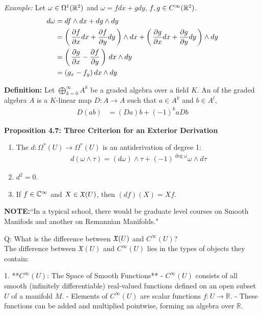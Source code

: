 \documentclass[10pt,a4paper]{report}
\begin{document}
\begin{enumerate}
	\textit{Example: }Let $\omega \in \Omega^1(\mathbb{R}^2)$ and $\omega = fdx+gdy$, $f,g \in C^\infty(\mathbb{R}^2)$.
	\begin{align*}
		d\omega &= df\wedge dx + dg\wedge dy \\
		&= \left (\, \frac{\partial f}{\partial x}dx+\frac{\partial f}{\partial y}dy \,\right )\wedge dx +\left (\, \frac{\partial g}{\partial x}dx+\frac{\partial g}{\partial y}dy \,\right )\wedge dy\\
		&= \left (\, \frac{\partial g}{\partial x}-\frac{\partial f}{\partial y} \,\right )\,dx\wedge dy\\
		&= (g_x-f_y)\,dx\wedge dy
	\end{align*}
	
	\textbf{Definition: } Let $\bigoplus_{k=0}^\infty A^k$ be a graded algebra over a field $K$. An  of the graded algebra $A$ is a $K$-linear map $D: A \to A$ such that $a\in A^k$ and $b\in A^l$,
	\begin{align*}
		D(ab) &= (Da)b + (-1)^kaDb
	\end{align*}
	
	\textbf{Proposition 4.7: Three Criterion for an Exterior Derivation} 
	\begin{enumerate}[label=\roman*)]
		\item The  $d: \Omega^*(U)\to\Omega^*(U)$ is an antiderivation of degree 1:
		\begin{align*}
			d(\omega\wedge\tau)=(d\omega)\wedge\tau + (-1)^{\deg\omega}\omega\wedge d\tau
	\end{align*}			
	\item $d^2=0$.
	\item If $f\in\mathbb{C}^\infty$ and $X \in \mathfrak{X}(U)$, then $(df)(X)=Xf$.
	\end{enumerate}
\end{enumerate}

\noindent\textbf{NOTE:}``In a typical school, there would be graduate level courses on Smooth Manifods and another  on Remannian Manifolds."

\newpage
Q: What is the difference between $\mathfrak{X}(U)$ and $C^\infty(U)$?\\


The difference between \( \mathfrak{X}(U) \) and \( C^\infty(U) \) lies in the types of objects they contain:

1. **\( C^\infty(U) \): The Space of Smooth Functions**
   - \( C^\infty(U) \) consists of all smooth (infinitely differentiable) real-valued functions defined on an open subset \( U \) of a manifold \( M \).
   - Elements of \( C^\infty(U) \) are scalar functions \( f: U \to \mathbb{R} \).
   - These functions can be added and multiplied pointwise, forming an algebra over \( \mathbb{R} \).\\
\end{document}

